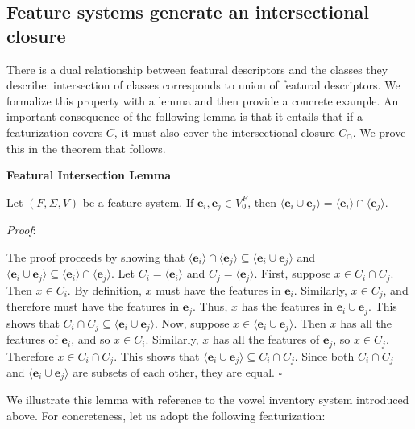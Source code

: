 \documentclass[12pt, oneside]{article}   	%
\newenvironment{clump}
{
	\edef\myindent{\the\parindent}
	\noindent\begin{minipage}{\textwidth}
	\setlength\parindent{\myindent}\fussy
}
{
	\end{minipage}
}
\begin{document}
\subsection{Feature systems generate an intersectional closure}

There is a dual relationship between featural descriptors and the classes they describe: intersection of classes corresponds to union of featural descriptors. We formalize this property with a lemma and then provide a concrete example. An important consequence of the following lemma is that it entails that if a featurization covers $C$, it must also cover the intersectional closure $C_\cap$. We prove this in the theorem that follows.

\begin{clump}
\vspace{\baselineskip} \noindent \textbf{Featural Intersection Lemma}

\indent Let $(F, \Sigma, V)$ be a feature system. If $\mathbf{e}_i, \mathbf{e}_j \in V_0^F$, then $\langle \mathbf{e}_i \cup \mathbf{e}_j \rangle =  \langle \mathbf{e}_i \rangle \cap \langle \mathbf{e}_j \rangle$.
\end{clump}

\noindent \textit{Proof}:

The proof proceeds by showing that $ \langle \mathbf{e}_i \rangle \cap \langle \mathbf{e}_j \rangle \subseteq \langle \mathbf{e}_i \cup \mathbf{e}_j \rangle$ and $\langle \mathbf{e}_i \cup \mathbf{e}_j \rangle \subseteq \langle \mathbf{e}_i \rangle \cap \langle \mathbf{e}_j \rangle$.
Let $C_i = \langle \mathbf{e}_i \rangle$ and $C_j = \langle \mathbf{e}_j \rangle$.
First, suppose $x \in C_i \cap C_j$. Then $x \in C_i$. By definition, $x$ must have the features in $\mathbf{e}_i$.
Similarly, $x \in C_j$, and therefore must have the features in $\mathbf{e}_j$.
Thus, $x$ has the features in $\mathbf{e}_i \cup \mathbf{e}_j$. This shows that $C_i \cap C_j \subseteq \langle \mathbf{e}_i \cup \mathbf{e}_j \rangle$.
Now, suppose $x \in \langle \mathbf{e}_i \cup \mathbf{e}_j \rangle$. Then $x$ has all the features of $\mathbf{e}_i$, and so $x \in C_i$.
Similarly, $x$ has all the features of $\mathbf{e}_j$, so $x \in C_j$. Therefore $x \in C_i \cap C_j$. This shows that $\langle \mathbf{e}_i \cup \mathbf{e}_j \rangle \subseteq C_i \cap C_j$.
Since both $C_i \cap C_j$ and $\langle \mathbf{e}_i \cup \mathbf{e}_j \rangle$ are subsets of each other, they are equal.
$\square$

\vspace{\baselineskip} We illustrate this lemma with reference to the vowel inventory system introduced above. For concreteness, let us adopt the following featurization:
\end{document}
